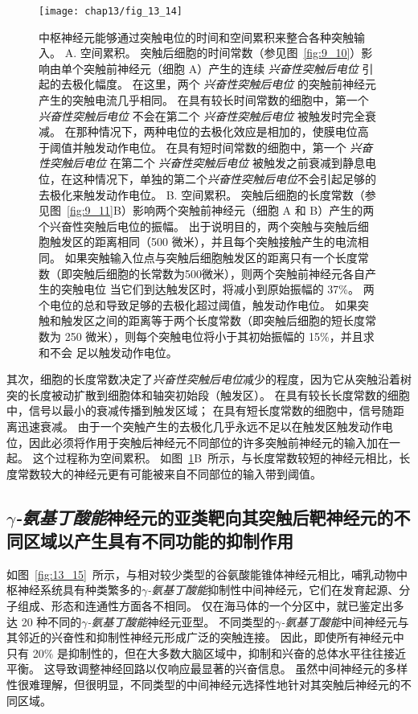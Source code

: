 \begin{figure}[htbp]
	\centering
	\texttt{[image: chap13/fig\_13\_14]}
	\caption{中枢神经元能够通过突触电位的时间和空间累积来整合各种突触输入。
		A. 空间累积。
		突触后细胞的时间常数（参见图~\ref{fig:9_10}）影响由单个突触前神经元（细胞 A）产生的连续 \textit{兴奋性突触后电位} 引起的去极化幅度。
		在这里，两个 \textit{兴奋性突触后电位} 的突触前神经元产生的突触电流几乎相同。
		在具有较长时间常数的细胞中，第一个 \textit{兴奋性突触后电位} 不会在第二个 \textit{兴奋性突触后电位} 被触发时完全衰减。
		在那种情况下，两种电位的去极化效应是相加的，使膜电位高于阈值并触发动作电位。
		在具有短时间常数的细胞中，第一个 \textit{兴奋性突触后电位} 在第二个 \textit{兴奋性突触后电位} 被触发之前衰减到静息电位，在这种情况下，单独的第二个\textit{兴奋性突触后电位}不会引起足够的去极化来触发动作电位。
		B. 空间累积。
		突触后细胞的长度常数（参见图~\ref{fig:9_11}B）影响两个突触前神经元（细胞 A 和 B）产生的两个兴奋性突触后电位的振幅。
		出于说明目的，两个突触与突触后细胞触发区的距离相同（500 微米），并且每个突触接触产生的电流相同。
		如果突触输入位点与突触后细胞触发区的距离只有一个长度常数（即突触后细胞的长常数为500微米），则两个突触前神经元各自产生的突触电位 当它们到达触发区时，将减小到原始振幅的 37\%。
		两个电位的总和导致足够的去极化超过阈值，触发动作电位。
		如果突触和触发区之间的距离等于两个长度常数（即突触后细胞的短长度常数为 250 微米），则每个突触电位将小于其初始振幅的 15\%，并且求和不会 足以触发动作电位。}
	\label{fig:13_14}
\end{figure}


其次，细胞的长度常数决定了\textit{兴奋性突触后电位}减少的程度，因为它从突触沿着树突的长度被动扩散到细胞体和轴突初始段（触发区）。
在具有较长长度常数的细胞中，信号以最小的衰减传播到触发区域；
在具有短长度常数的细胞中，信号随距离迅速衰减。
由于一个突触产生的去极化几乎永远不足以在触发区触发动作电位，因此必须将作用于突触后神经元不同部位的许多突触前神经元的输入加在一起。
这个过程称为空间累积。
如图~\ref{fig:13_14}B~所示，与长度常数较短的神经元相比，长度常数较大的神经元更有可能被来自不同部位的输入带到阈值。



\subsection{\textit{$\gamma$-氨基丁酸能}神经元的亚类靶向其突触后靶神经元的不同区域以产生具有不同功能的抑制作用}

如图~\ref{fig:13_15}~所示，与相对较少类型的谷氨酸能锥体神经元相比，哺乳动物中枢神经系统具有种类繁多的\textit{$\gamma$-氨基丁酸能}抑制性中间神经元，它们在发育起源、分子组成、形态和连通性方面各不相同。
仅在海马体的一个分区中，就已鉴定出多达 20 种不同的\textit{$\gamma$-氨基丁酸能}神经元亚型。
不同类型的\textit{$\gamma$-氨基丁酸能}中间神经元与其邻近的兴奋性和抑制性神经元形成广泛的突触连接。
因此，即使所有神经元中只有 20\% 是抑制性的，但在大多数大脑区域中，抑制和兴奋的总体水平往往接近平衡。
这导致调整神经回路以仅响应最显著的兴奋信息。
虽然中间神经元的多样性很难理解，但很明显，不同类型的中间神经元选择性地针对其突触后神经元的不同区域。


